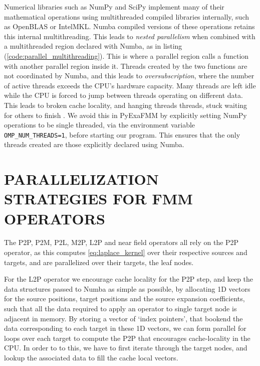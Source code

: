 \documentclass{IEEEcsmag}
\begin{document}
Numerical libraries such as NumPy and SciPy implement many of their mathematical operations using multithreaded compiled libraries internally, such as OpenBLAS or IntelMKL. Numba compiled versions of these operations retains this internal multithreading. This leads to \textit{nested parallelism} when combined with a multithreaded region declared with Numba, as in listing (\ref{code:parallel_multithreading}). This is where a parallel region calls a function with another parallel region inside it. Threads created by the two functions are not coordinated by Numba, and this leads to \textit{oversubscription}, where the number of active threads exceeds the CPU's hardware capacity. Many threads are left idle while the CPU is forced to jump between threads operating on different data. This leads to broken cache locality, and hanging threads threads, stuck waiting for others to finish \cite{Malakhov2016}. We avoid this in PyExaFMM by explicitly setting NumPy operations to be single threaded, via the environment variable \lstinline{OMP_NUM_THREADS=1}, before starting our program. This ensures that the only threads created are those explicitly declared using Numba.



\section{PARALLELIZATION STRATEGIES FOR FMM OPERATORS}

The P2P, P2M, P2L, M2P, L2P and near field operators all rely on the P2P operator, as this computes \ref{eq:laplace_kernel} over their respective sources and targets, and are parallelized over their targets, the leaf nodes.

For the L2P operator we encourage cache locality for the P2P step, and keep the data structures passed to Numba as simple as possible, by allocating 1D vectors for the source positions, target positions and the source expansion coefficients, such that all the data required to apply an operator to single target node is adjacent in memory. By storing a vector of `index pointers', that bookend the data corresponding to each target in these 1D vectors, we can form parallel for loops over each target to compute the P2P that encourages cache-locality in the CPU. In order to to this, we have to first iterate through the target nodes, and lookup the associated data to fill the cache local vectors.
\end{document}
